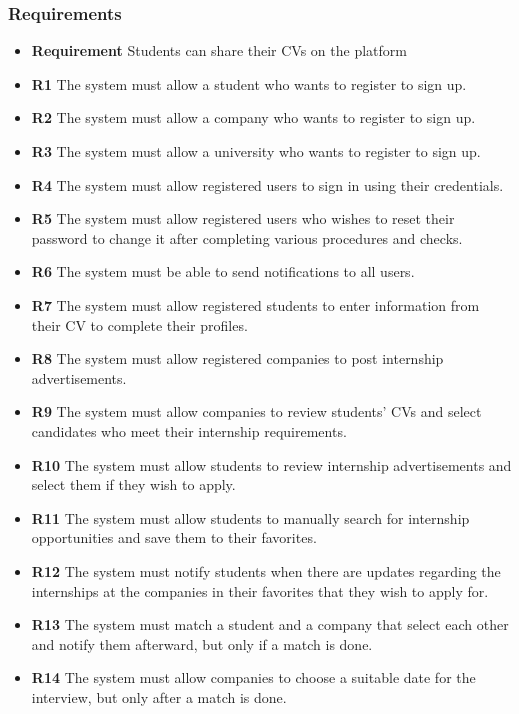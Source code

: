 \documentclass{article}
\begin{document}
\subsubsection{Requirements}
    \begin{itemize}
        \item \textbf{Requirement} Students can share their CVs on the platform
        \item \textbf{R1} The system must allow a student who wants to register to sign up.
        \item \textbf{R2} The system must allow a company who wants to register to sign up.
        \item \textbf{R3} The system must allow a university who wants to register to sign up.
        \item \textbf{R4} The system must allow registered users to sign in using their credentials.
        \item \textbf{R5} The system must allow registered users who wishes to reset their password to change it after completing various procedures and checks.
        \item \textbf{R6} The system must be able to send notifications to all users.
        \item \textbf{R7} The system must allow registered students to enter information from their CV to complete their profiles.
        \item \textbf{R8} The system must allow registered companies to post internship advertisements.
        \item \textbf{R9} The system must allow companies to review students' CVs and select candidates who meet their internship requirements.
        \item \textbf{R10} The system must allow students to review internship advertisements and select them if they wish to apply.
         \item \textbf{R11} The system must allow students to manually search for internship opportunities and save them to their favorites.
         \item \textbf{R12} The system must notify students when there are updates regarding the internships at the companies in their favorites that they wish to apply for.
        \item \textbf{R13} The system must match a student and a company that select each other and notify them afterward, but only if a match is done.
        \item \textbf{R14} The system must allow companies to choose a suitable date for the interview, but only after a match is done.

\end{itemize}
\end{document}
